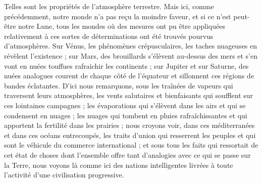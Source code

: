 \documentclass[a4paper, 11pt, oneside, landscape]{article}
\begin{document}
Telles sont les propriétés de l'atmosphère terrestre. Mais ici, comme précédemment, notre monde n'a pas reçu la moindre faveur, et si ce n'est peut-être notre Lune, tous les mondes où des mesures ont pu être appliquées relativement à ces sortes de déterminations ont été trouvés pourvus d'atmosphères. Sur Vénus, les phénomènes crépusculaires, les taches nuageuses en révèlent l'existence ; sur Mars, des brouillards s'élèvent au-dessus des mers et s'en vont en nuées touffues rafraichir les continents ; sur Jupiter et sur Saturne, des nuées analogues courent de chaque côté de l'équateur et sillonnent ces régions de bandes éclatantes. D'ici nous remarquons, sous les traînées de vapeurs qui traversent leurs atmosphères, les vents salutaires et bienfaisants qui soufflent sur ces lointaines campagnes ; les évaporations qui s'élèvent dans les airs et qui se condensent en nuages ; les nuages qui tombent en pluies rafraîchissantes et qui apportent la fertilité dans les prairies ; nous croyons voir, dans ces méditerranées et dans ces océans entrecoupés, les traits d'union qui resserrent les peuples et qui sont le véhicule du commerce international ; et sous tous les faits qui ressortait de cet état de choses dont l'ensemble offre tant d'analogies avec ce qui se passe sur la Terre, nous voyons là comme ici des nations intelligentes livrées à toute l'activité d'une civilisation progressive.
\end{document}

